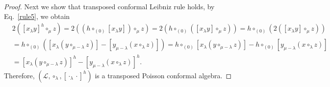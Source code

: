 \documentclass[11pt,letterpaper,reqno]{amsart}
\theoremstyle{definition}
\numberwithin{equation}{section}
\begin{document}
\begin{proof}
   Next we show that transposed conformal Leibniz rule holds, by Eq.~\eqref{rule5}, we obtain
     \begin{align*}
      & 2([x_{\lambda}y]^h\circ_{\mu}z)=2((h\circ_{(0)}[x_{\lambda}y])\circ_{\mu}z)=2(h\circ_{(0)}([x_{\lambda}y]\circ_{\mu}z))
      =h\circ_{(0)}(2([x_{\lambda}y]\circ_{\mu}z))\\
      &= h\circ_{(0)}([x_{{\lambda}}(y\circ_{\mu-\lambda}z)]-[y_{\mu-\lambda}(x\circ_{\lambda}z)])
      =h\circ_{(0)}[x_{{\lambda}}(y\circ_{\mu-\lambda}z)]-h\circ_{(0)}[y_{\mu-\lambda}(x\circ_{\lambda}z)]  \\
      &= [x_{{\lambda}}(y\circ_{\mu-\lambda}z)]^h-[y_{\mu-\lambda}(x\circ_{\lambda}z)]^h.
     \end{align*}
Therefore, $(\mathcal{L} ,\circ_\lambda, [\cdot_{\lambda}\cdot]^h)$ is a transposed Poisson conformal algebra.
\end{proof}
\end{document}
